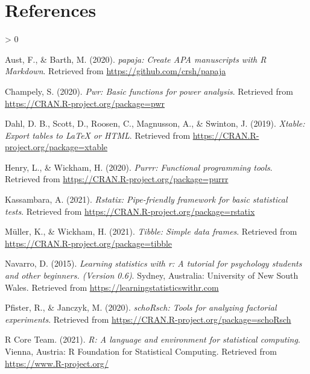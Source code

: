 \documentclass[
  english,
  man]{apa6}
\newlength{\cslhangindent}
\newenvironment{CSLReferences}[2] %
 {%
  \setlength{\parindent}{0pt}
  \ifodd #1 \everypar{\setlength{\hangindent}{\cslhangindent}}\ignorespaces\fi
  \ifnum #2 > 0
  \setlength{\parskip}{#2\baselineskip}
  \fi
 }%
 {}
\begin{document}
\newpage

\hypertarget{references}{%
\section{References}\label{references}}

\begingroup
\setlength{\parindent}{-0.5in}
\setlength{\leftskip}{0.5in}

\hypertarget{refs}{}
\begin{CSLReferences}{1}{0}
\leavevmode\hypertarget{ref-R-papaja}{}%
Aust, F., \& Barth, M. (2020). \emph{{papaja}: {Create} {APA} manuscripts with {R Markdown}}. Retrieved from \url{https://github.com/crsh/papaja}

\leavevmode\hypertarget{ref-R-pwr}{}%
Champely, S. (2020). \emph{Pwr: Basic functions for power analysis}. Retrieved from \url{https://CRAN.R-project.org/package=pwr}

\leavevmode\hypertarget{ref-R-xtable}{}%
Dahl, D. B., Scott, D., Roosen, C., Magnusson, A., \& Swinton, J. (2019). \emph{Xtable: Export tables to LaTeX or HTML}. Retrieved from \url{https://CRAN.R-project.org/package=xtable}

\leavevmode\hypertarget{ref-R-purrr}{}%
Henry, L., \& Wickham, H. (2020). \emph{Purrr: Functional programming tools}. Retrieved from \url{https://CRAN.R-project.org/package=purrr}

\leavevmode\hypertarget{ref-R-rstatix}{}%
Kassambara, A. (2021). \emph{Rstatix: Pipe-friendly framework for basic statistical tests}. Retrieved from \url{https://CRAN.R-project.org/package=rstatix}

\leavevmode\hypertarget{ref-R-tibble}{}%
Müller, K., \& Wickham, H. (2021). \emph{Tibble: Simple data frames}. Retrieved from \url{https://CRAN.R-project.org/package=tibble}

\leavevmode\hypertarget{ref-R-lsr}{}%
Navarro, D. (2015). \emph{Learning statistics with r: A tutorial for psychology students and other beginners. (Version 0.6)}. Sydney, Australia: University of New South Wales. Retrieved from \url{https://learningstatisticswithr.com}

\leavevmode\hypertarget{ref-R-schoRsch}{}%
Pfister, R., \& Janczyk, M. (2020). \emph{schoRsch: Tools for analyzing factorial experiments}. Retrieved from \url{https://CRAN.R-project.org/package=schoRsch}

\leavevmode\hypertarget{ref-R-base}{}%
R Core Team. (2021). \emph{R: A language and environment for statistical computing}. Vienna, Austria: R Foundation for Statistical Computing. Retrieved from \url{https://www.R-project.org/}


\end{CSLReferences}
\end{document}
